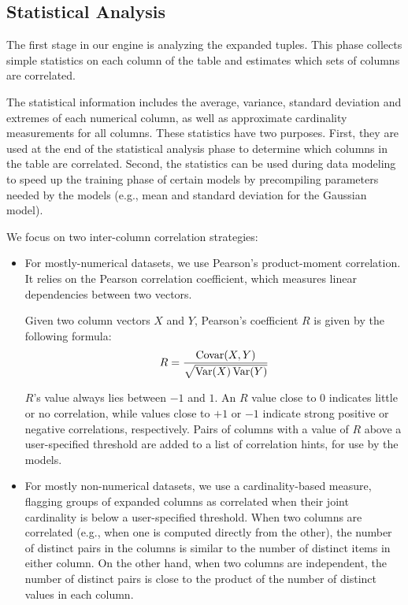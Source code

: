 \subsection{Statistical Analysis}
\label{sec:statistical-analysis}

The first stage in our engine is analyzing the expanded tuples.
This phase collects simple statistics on each column of the table and estimates which sets of columns are correlated.

The statistical information includes the average, variance, standard deviation and extremes of each numerical column, as well as approximate cardinality measurements for all columns. These statistics have two purposes. First, they are used at the end of the statistical analysis phase to determine which columns in the table are correlated. Second, the statistics can be used during data modeling to speed up the training phase of certain models by precompiling parameters needed by the models (e.g., mean and standard deviation for the Gaussian model).

We focus on two inter-column correlation strategies:

\begin{itemize}
\item For mostly-numerical datasets, we use Pearson's product-moment
  correlation. It relies on the Pearson correlation coefficient,
  which measures linear dependencies between two vectors.

  Given two column vectors $X$ and $Y$, Pearson's coefficient $R$ is given by the following formula:
  \begin{align}
    \label{eqn:pearson}
    R = \frac{\operatorname{Covar}(X,Y)}{\sqrt{\operatorname{Var}(X)\operatorname{Var}(Y)}}
  \end{align}

  $R$'s value always lies between $-1$ and $1$. An $R$ value close to 0 indicates little or no correlation, while values close to $+1$ or $-1$ indicate strong positive or negative correlations, respectively. Pairs of columns with a value of \(R\) above a user-specified threshold are added to a list of correlation hints, for use by the models.

\item For mostly non-numerical datasets, we use a cardinality-based measure, flagging groups of expanded columns as correlated when their joint cardinality is below a user-specified threshold. When two columns are correlated (e.g., when one is computed directly from the other), the number of distinct pairs in the columns is similar to the number of distinct items in either column. On the other hand, when two columns are independent, the number of distinct pairs is close to the product of the number of distinct values in each column.
\end{itemize}

